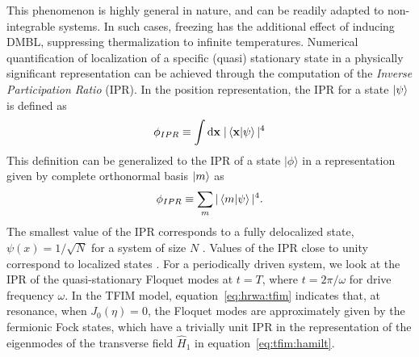 \documentclass[%
reprint,
superscriptaddress,
amsmath,amssymb,
aps,
prb,
showkeys,
]{revtex4-2}
\begin{document}
	This phenomenon is highly general in nature, and can be readily adapted to non-integrable systems. In such cases, freezing has the additional effect of inducing DMBL, suppressing thermalization to infinite temperatures. Numerical quantification of localization of a specific (quasi) stationary state in a physically significant representation can be achieved through the computation of the \emph{Inverse Participation Ratio} (IPR).  In the position representation, the IPR for a state $\ket{\psi}$  \cite{mukherjee_modulation-assisted_2015,lin_many-body_2018,murphy_generalized_2011, torres-herrera_self-averaging_2020} is defined as
	\begin{equation*}
		\phi_{IPR}\equiv \int \mathrm{d}\mathbf{x}\;\vert\ip{\mathbf{x}}{\psi}\vert^4
	\end{equation*}
	This definition can be generalized to the IPR of a state $|\phi\rangle$ in a representation given by complete orthonormal basis $\ket{m}$ as 
	\begin{equation}
	\label{eq:ipr:defn}
	\phi_{IPR} \equiv \sum_m\vert\ip{m}{\psi}\vert^4.
	\end{equation}
	The smallest value of the IPR corresponds to a fully delocalized state, $\psi(x)=1/\sqrt{N}$ for a system of size $N$ \cite{torres-herrera_self-averaging_2020,trivedi_can_2005}. Values of the IPR close to unity correspond to localized states \cite{misguich_inverse_2016}. For a periodically driven system, we look at the IPR of the quasi-stationary Floquet modes at $t=T$, where $t=2\pi/\omega$ for drive frequency $\omega$. In the TFIM model, equation~\ref{eq:hrwa:tfim} indicates that, at resonance, when $J_0(\eta)=0$, the Floquet modes are approximately given by the fermionic Fock states, which have a trivially unit IPR in the representation of the eigenmodes of the transverse field $\hat{H}_1$ in equation~\ref{eq:tfim:hamilt}.
		
\end{document}
